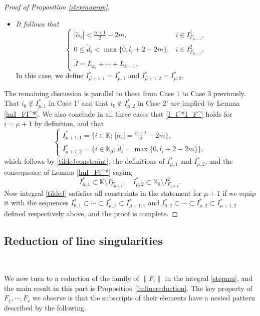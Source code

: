 \documentclass[11pt,reqno]{amsart}
\numberwithin{equation}{section}
\theoremstyle{definition}
\begin{document}
\begin{proof}[Proof of Proposition \ref{stepmuprop}]
\begin{itemize}
		\item[\emph{Case 3'}] \textit{It follows that}
		\begin{equation*}
			\begin{cases}
				|\tilde{\alpha}_i|<\frac{n+1}{2}-2m,\quad&i\in I_{F_{\mu+1}}^1,\\
				0\leq\tilde{d}_i<\max\{0,l_i+2-2m\},&i\in I_{F_{\mu+1}}^2,\\
				\tilde{J}=L_{k_0}+\cdots+L_{k-1}.
			\end{cases}
		\end{equation*}
		In this case, we define $I_{\mu+1,1}^*=I_{\mu,1}^*$ and $I_{\mu+1,2}^*=I_{\mu,2}^*$.
	\end{itemize}
	The remaining discussion is parallel to those from Case 1 to Case 3 previously. That $i_0\notin I_{\mu,1}^*$ in Case 1' and that $i_0\notin I_{\mu,2}^*$ in Case 2' are implied by Lemma \ref{lmI_FI^*}. We also conclude in all three cases that \eqref{I_i^*I_F^} holds for $i=\mu+1$ by definition, and that
	\begin{equation*}
		\begin{cases}
			I_{\mu+1,1}^*=\{i\in\mathbb{K};\,|\tilde{\alpha}_i|=\mbox{$\frac{n+1}{2}-2m$}\},\\
			I_{\mu+1,2}^*=\{i\in\mathbb{K}_0;\,\tilde{d}_i=\max\{0,l_i+2-2m\}\},
		\end{cases}
	\end{equation*}
	which follows by \eqref{tildeJconstraint}, the definitions of $I_{\mu,1}^*$ and $I_{\mu,2}^*$, and the consequence of Lemma \ref{lmI_FI^*} saying
	\begin{equation*}
		I_{\mu,1}^*\subset\mathbb{K}\setminus I_{F_{\mu+1}}^1,\quad I_{\mu,2}^*\subset\mathbb{K}_0\setminus I_{F_{\mu+1}}^2.
	\end{equation*}
	Now integral \eqref{tildeJ} satisfies all constraints in the statement for $\mu+1$ if we equip it with the sequences $I_{0,1}^*\subset\cdots\subset I_{\mu,1}^*\subset I_{\mu+1,1}^*$ and $I_{0,2}^*\subset\cdots\subset I_{\mu,2}^*\subset I_{\mu+1,2}^*$ defined respectively above, and the proof is complete.
\end{proof}

\subsection{Reduction of line singularities}\label{section5.3}\

We now turn to a reduction of the family of $\|F_i\|$ in the integral \eqref{stepmu}, and the main result in this part is Proposition \ref{lmlinereduction}. The key property of $F_1,\cdots,F_s$ we observe is that the subscripts of their elements have a nested pattern described by the following.
\end{document}
